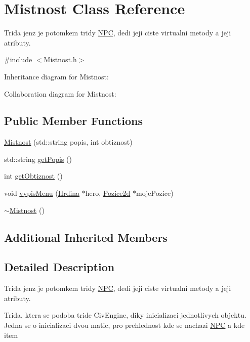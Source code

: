 \hypertarget{class_mistnost}{\section{Mistnost Class Reference}
\label{class_mistnost}
}


Trida jenz je potomkem tridy \hyperlink{class_n_p_c}{N\-P\-C}, dedi jeji ciste virtualni metody a jeji atributy.  




{\ttfamily \#include $<$Mistnost.\-h$>$}



Inheritance diagram for Mistnost\-:


Collaboration diagram for Mistnost\-:
\subsection*{Public Member Functions}
\begin{DoxyCompactItemize}
\item 
\hyperlink{class_mistnost_a63a70c9eeb1d6f96705e372e64bae7e0}{Mistnost} (std\-::string popis, int obtiznost)
\item 
std\-::string \hyperlink{class_mistnost_a465f2f31dedde17a96bd4033b05a6ddf}{get\-Popis} ()
\item 
int \hyperlink{class_mistnost_a23b1b673d70e0d963b1784198a86b2d8}{get\-Obtiznost} ()
\item 
void \hyperlink{class_mistnost_a5168a58b39e621a5d4c647d19f3ed5e2}{vypis\-Menu} (\hyperlink{class_hrdina}{Hrdina} $\ast$hero, \hyperlink{struct_pozice2d}{Pozice2d} $\ast$moje\-Pozice)
\item 
\hyperlink{class_mistnost_a99a72e7bbaf1585f74267324171bd131}{$\sim$\-Mistnost} ()
\end{DoxyCompactItemize}
\subsection*{Additional Inherited Members}


\subsection{Detailed Description}
Trida jenz je potomkem tridy \hyperlink{class_n_p_c}{N\-P\-C}, dedi jeji ciste virtualni metody a jeji atributy. 

Trida, ktera se podoba tride Civ\-Engine, diky inicializaci jednotlivych objektu. Jedna se o inicializaci dvou matic, pro prehlednost kde se nachazi \hyperlink{class_n_p_c}{N\-P\-C} a kde item 

